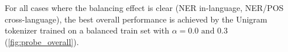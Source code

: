 For all cases where the balancing effect is clear (NER in-language, NER/POS cross-language), the best overall performance is achieved by the Unigram tokenizer trained on a balanced train set with $\alpha=0.0\text{ and }0.3$ (\autoref{fig:probe_overall}). 


